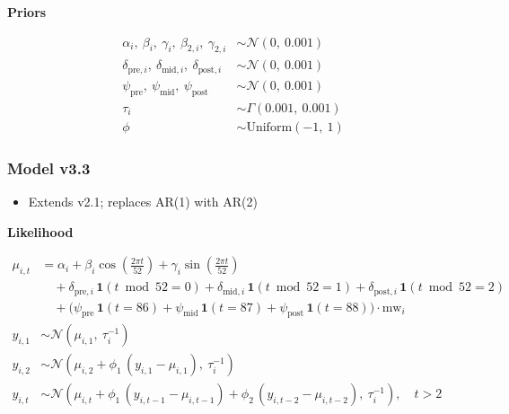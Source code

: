 \documentclass[
]{article}
\providecommand{\tightlist}{%
  \setlength{\itemsep}{0pt}\setlength{\parskip}{0pt}}
\begin{document}
\textbf{Priors}

\[
\begin{aligned}
\alpha_i,\ \beta_i,\ \gamma_i,\ \beta_{2,i},\ \gamma_{2,i} &\sim \mathcal{N}(0,\ 0.001) \\[4pt]
\delta_{\text{pre},i},\ \delta_{\text{mid},i},\ \delta_{\text{post},i} &\sim \mathcal{N}(0,\ 0.001) \\[4pt]
\psi_{\text{pre}},\ \psi_{\text{mid}},\ \psi_{\text{post}} &\sim \mathcal{N}(0,\ 0.001) \\[4pt]
\tau_i &\sim \Gamma(0.001,\ 0.001) \\[4pt]
\phi   &\sim \mathrm{Uniform}(-1,\ 1)
\end{aligned}
\]

\subsubsection*{Model v3.3}\label{model-v3.3}

\begin{itemize}
\tightlist
\item
  Extends v2.1; replaces AR(1) with AR(2)
\end{itemize}

\textbf{Likelihood}

\[
\begin{aligned}
\mu_{i,t} &= \alpha_i
              + \beta_i \cos\!\left(\tfrac{2\pi t}{52}\right)
              + \gamma_i \sin\!\left(\tfrac{2\pi t}{52}\right) \\[4pt]
           &\quad + \delta_{\text{pre},i}\,\mathbf{1}(t \bmod 52 = 0)
              + \delta_{\text{mid},i}\,\mathbf{1}(t \bmod 52 = 1)
              + \delta_{\text{post},i}\,\mathbf{1}(t \bmod 52 = 2) \\[4pt]
           &\quad + \bigl(\psi_{\text{pre}}\,\mathbf{1}(t = 86)
              + \psi_{\text{mid}}\,\mathbf{1}(t = 87)
              + \psi_{\text{post}}\,\mathbf{1}(t = 88)\bigr)\cdot\mathrm{mw}_i \\[4pt]
y_{i,1} &\sim \mathcal{N}(\mu_{i,1},\ \tau_i^{-1}) \\[4pt]
y_{i,2} &\sim \mathcal{N}\!\left(\mu_{i,2} + \phi_1\,(y_{i,1} - \mu_{i,1}),\ \tau_i^{-1}\right) \\[4pt]
y_{i,t} &\sim \mathcal{N}\!\left(\mu_{i,t} + \phi_1\,(y_{i,t-1} - \mu_{i,t-1})
              + \phi_2\,(y_{i,t-2} - \mu_{i,t-2}),\ \tau_i^{-1}\right), \quad t > 2
\end{aligned}
\]
\end{document}
